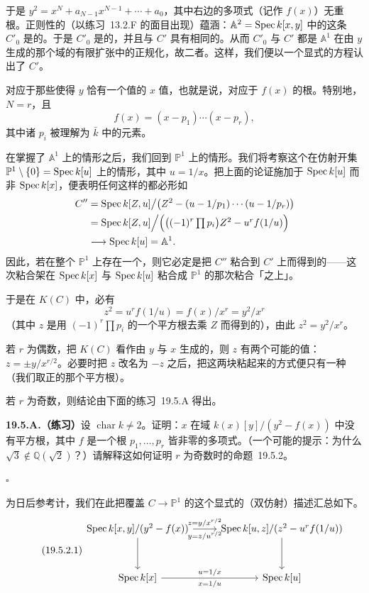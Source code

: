 于是 $y^2=x^N+a_{N-1}x^{N-1}+\cdots+a_0$，其中右边的多项式（记作 $f(x)$）无重根。正则性的\trJacobianCriterion（以\mbox{练习~13.2.F} 的面目出现）蕴涵：$\mathbb{A}^2=\operatorname{Spec} k[x,y]$ 中的这条\trCurve{} $C'_0$ 是\trRegular{}的。于是 $C'_0$ 是\trNormal{}的，并且与 $C'$ 具有相同的\trFunctionField。从而 $C'_0$ 与 $C'$ 都是 $\mathbb{A}^1$ 在由 $y$ 生成的那个域的有限扩张中的正规化，故二者\trIsomorphic。这样，我们便以一个显式的方程认出了 $C'$。

\trBranchPoint{}对应于那些使得 $y$ 恰有一个值的 $x$ 值，也就是说，对应于 $f(x)$ 的根。特别地，$N=r$，且
\[
f(x)=(x-p_1)\cdots(x-p_r),
\]
其中诸 $p_i$ 被理解为 $\bar{k}$ 中的元素。

在掌握了 $\mathbb{A}^1$ 上的情形之后，我们回到 $\mathbb{P}^1$ 上的情形。我们将考察这个\trBranchedCover{}在仿射开集 $\mathbb{P}^1\setminus\{0\}=\operatorname{Spec} k[u]$ 上的情形，其中 $u=1/x$。把上面的论证施加于 $\operatorname{Spec} k[u]$ 而非 $\operatorname{Spec} k[x]$，便表明任何这样的\trDoubleCover{}都必形如
\[
\begin{aligned}
C''&=\operatorname{Spec} k[Z,u]\big/\bigl(Z^2-(u-1/p_1)\cdots(u-1/p_r)\bigr)\\
&=\operatorname{Spec} k[Z,u]\Big/\Bigl(\bigl((-1)^r\textstyle\prod p_i\bigr)Z^2-u^rf(1/u)\Bigr)\\
&\longrightarrow \operatorname{Spec} k[u]=\mathbb{A}^1.
\end{aligned}
\]
因此，若在整个 $\mathbb{P}^1$ 上存在一个\trDoubleCover，则它必定是把 $C''$ 粘合到 $C'$ 上而得到的——这次粘合架在 $\operatorname{Spec} k[x]$ 与 $\operatorname{Spec} k[u]$ 粘合成 $\mathbb{P}^1$ 的那次粘合「之上」。

于是在 $K(C)$ 中，必有
\[
z^2=u^rf(1/u)=f(x)/x^r=y^2/x^r
\]
（其中 $z$ 是用 $(-1)^r\prod p_i$ 的一个平方根去乘 $Z$ 而得到的），由此 $z^2=y^2/x^r$。

若 $r$ 为偶数，把 $K(C)$ 看作由 $y$ 与 $x$ 生成的，则 $z$ 有两个可能的值：$z=\pm y/x^{r/2}$。必要时把 $z$ 改名为 $-z$ 之后，把这两块粘起来的方式便只有一种（我们取正的那个平方根）。

若 $r$ 为奇数，则结论由下面的\mbox{练习~19.5.A} 得出。

\textbf{19.5.A.（练习）}\quad 设 $\operatorname{char}k\ne 2$。证明：$x$ 在域 $k(x)[y]/(y^2-f(x))$ 中没有平方根，其中 $f$ 是一个根 $p_1,\dots,p_r$ 皆非零的多项式。（一个可能的提示：为什么 $\sqrt{3}\notin\mathbb{Q}(\sqrt{2})$？）请解释这如何证明 $r$ 为奇数时的\mbox{命题~19.5.2}。

\begin{flushright}
$\square$
\end{flushright}

为日后参考计，我们在此把\trHyperelliptic{}覆盖 $C\to\mathbb{P}^1$ 的这个显式的（双仿射）描述汇总如下。
\begin{equation*}\tag{19.5.2.1}\label{eq:hyperelliptic-two-affine}
\begin{tikzcd}[row sep=3.2em]
\Spec k[x,y]/(y^2-f(x)) \dar \rar["z=y/x^{r/2}","y=z/u^{r/2}"'] & \Spec k[u,z]/(z^2-u^rf(1/u)) \dar \\
\Spec k[x] \rar["u=1/x","x=1/u"'] & \Spec k[u]
\end{tikzcd}
\end{equation*}

